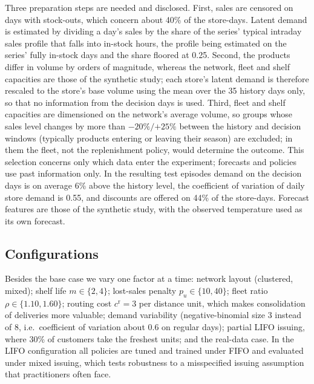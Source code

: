 Three preparation steps are needed and disclosed. First, sales are censored on days with stock-outs, which concern about 40\% of the store-days. Latent demand is estimated by dividing a day's sales by the share of the series' typical intraday sales profile that falls into in-stock hours, the profile being estimated on the series' fully in-stock days and the share floored at 0.25. Second, the products differ in volume by orders of magnitude, whereas the network, fleet and shelf capacities are those of the synthetic study; each store's latent demand is therefore rescaled to the store's base volume using the mean over the 35 history days only, so that no information from the decision days is used. Third, fleet and shelf capacities are dimensioned on the network's average volume, so groups whose sales level changes by more than $-20\%/{+25\%}$ between the history and decision windows (typically products entering or leaving their season) are excluded; in them the fleet, not the replenishment policy, would determine the outcome. This selection concerns only which data enter the experiment; forecasts and policies use past information only. In the resulting test episodes demand on the decision days is on average 6\% above the history level, the coefficient of variation of daily store demand is 0.55, and discounts are offered on 44\% of the store-days. Forecast features are those of the synthetic study, with the observed temperature used as its own forecast.

\subsection{Configurations}

Besides the base case we vary one factor at a time: network layout (clustered, mixed); shelf life $m\in\{2,4\}$; lost-sales penalty $p_u\in\{10,40\}$; fleet ratio $\rho\in\{1.10,1.60\}$; routing cost $c^{\mathrm{r}}=3$ per distance unit, which makes consolidation of deliveries more valuable; demand variability (negative-binomial size 3 instead of 8, i.e.\ coefficient of variation about 0.6 on regular days); partial LIFO issuing, where 30\% of customers take the freshest units; and the real-data case. In the LIFO configuration all policies are tuned and trained under FIFO and evaluated under mixed issuing, which tests robustness to a misspecified issuing assumption that practitioners often face.

